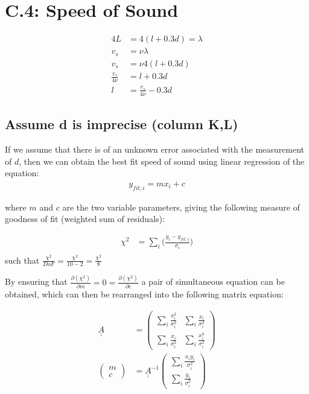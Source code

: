 \documentclass[a4paper, 12pt]{article}
\begin{document}
\begin{center}
\end{center}

\section{C.4: Speed of Sound}
\begin{align}
	4L&=4(l+0.3d)=\lambda	\\
	v_s&=\nu\lambda			\\
	v_s&=\nu 4(l+0.3d)		\\
	\frac{v_s}{4\nu} &= l+0.3d \\
	l &= \frac{v_s}{4\nu} - 0.3d \label{LinGressForm}
\end{align}
\subsection{Assume d is imprecise (column K,L)}
If we assume that there is of an unknown error associated with the measurement of $d$, then we can obtain the best fit speed of sound using linear regression of the equation:
\begin{align}
	y_{fit,i}=mx_i+c \label{GeneralLinGress}
\end{align}

where $m$ and $c$ are the two variable parameters,
giving the following measure of goodness of fit (weighted sum of residuals):

\begin{align}
	\chi^2 &=\sum\limits_{i} \bigg( \frac{y_i - y_{fit,i}}{\sigma_i} \bigg)	\\
\end{align}
such that $\frac{\chi^2}{DoF} = \frac{\chi^2}{10-2} = \frac{\chi^2}{8}$

By ensuring that $\frac{\partial (\chi^2)}{\partial m}=0=\frac{\partial (\chi^2)}{\partial c}$ a pair of simultaneous equation can be obtained, which can then be rearranged into the following matrix equation:

\begin{align}
	\underline{\underline{A}} &=
		\begin{pmatrix}
			\sum\limits_{i}\frac{x_i^2}{\sigma_i^2} & \sum\limits_{i}\frac{x_i}{\sigma_i^2} \\
			\sum\limits_{i}\frac{x_i}{\sigma_i^2} & \sum\limits_{i}\frac{x_i^0}{\sigma_i^2} 
		\end{pmatrix} \label{InverseMatrix} \\
	\begin{pmatrix}
		m\\c
	\end{pmatrix}
	&= \underline{\underline{A}}^{-1}
	\begin{pmatrix}
		\sum\limits_{i}\frac{x_i y_i}{\sigma_i^2} \\ \sum\limits_{i}\frac{y_i}{\sigma_i^2}
	\end{pmatrix} \label{MatrixMultiply}
\end{align}
\end{document}

